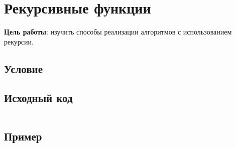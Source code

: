 
\usepackage{minted}





\section{Рекурсивные функции}

\textbf{Цель работы}: изучить способы реализации алгоритмов с использованием рекурсии.

\subsection{Условие}



\subsection{Исходный код}
\inputminted[fontsize=\footnotesize]{c}{../task.c}

\subsection{Пример}
\inputminted[fontsize=\footnotesize]{text}{examples/example.txt}


